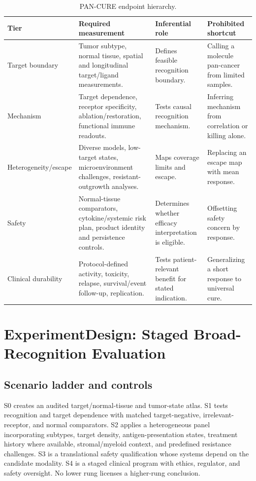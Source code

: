 \documentclass[10pt,conference]{IEEEtran}
\begin{document}
\begin{table}[!t]\caption{PAN-CURE endpoint hierarchy.}\label{tab:endpoints}\centering\footnotesize
\begin{tabular}{@{}p{}p{}p{}p{}@{}}\toprule
Tier & Required measurement & Inferential role & Prohibited shortcut\\\midrule
Target boundary & Tumor subtype, normal tissue, spatial and longitudinal target/ligand measurements. & Defines feasible recognition boundary. & Calling a molecule pan-cancer from limited samples.\\
Mechanism & Target dependence, receptor specificity, ablation/restoration, functional immune readouts. & Tests causal recognition mechanism. & Inferring mechanism from correlation or killing alone.\\
Heterogeneity/escape & Diverse models, low-target states, microenvironment challenges, resistant-outgrowth analyses. & Maps coverage limits and escape. & Replacing an escape map with mean response.\\
Safety & Normal-tissue comparators, cytokine/systemic risk plan, product identity and persistence controls. & Determines whether efficacy interpretation is eligible. & Offsetting safety concern by response.\\
Clinical durability & Protocol-defined activity, toxicity, relapse, survival/event follow-up, replication. & Tests patient-relevant benefit for stated indication. & Generalizing a short response to universal cure.\\\bottomrule\end{tabular}\end{table}

\section{ExperimentDesign: Staged Broad-Recognition Evaluation}\label{sec:design}
\subsection{Scenario ladder and controls}
S0 creates an audited target/normal-tissue and tumor-state atlas. S1 tests recognition and target dependence with matched target-negative, irrelevant-receptor, and normal comparators. S2 applies a heterogeneous panel incorporating subtypes, target density, antigen-presentation states, treatment history where available, stromal/myeloid context, and predefined resistance challenges. S3 is a translational safety qualification whose systems depend on the candidate modality. S4 is a staged clinical program with ethics, regulator, and safety oversight. No lower rung licenses a higher-rung conclusion.
\end{document}
